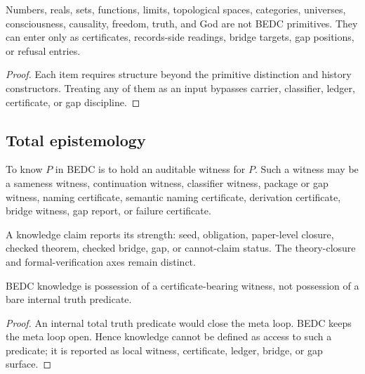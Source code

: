 \begin{corollary}
\label{cor:philosophy-mature-objects-not-inputs}
Numbers, reals, sets, functions, limits, topological spaces,
categories, universes, consciousness, causality, freedom, truth, and
God are not BEDC primitives. They can enter only as certificates,
records-side readings, bridge targets, gap positions, or refusal
entries.
\end{corollary}
\begin{proof}
Each item requires structure beyond the primitive distinction and
history constructors. Treating any of them as an input bypasses
carrier, classifier, ledger, certificate, or gap discipline.
\end{proof}

\subsection{Total epistemology}
\label{subsec:philosophy-total-epistemology}

\begin{definition}
\label{def:philosophy-bedc-knowledge-total}
To know \(P\) in BEDC is to hold an auditable witness for \(P\). Such a
witness may be a sameness witness, continuation witness, classifier
witness, package or gap witness, naming certificate, semantic naming
certificate, derivation certificate, bridge witness, gap report, or
failure certificate.
\end{definition}

\begin{definition}
\label{def:philosophy-knowledge-strength-total}
A knowledge claim reports its strength: seed, obligation, paper-level
closure, checked theorem, checked bridge, gap, or cannot-claim status.
The theory-closure and formal-verification axes remain distinct.
\end{definition}

\begin{theorem}
\label{thm:philosophy-knowledge-not-bare-truth-total}
BEDC knowledge is possession of a certificate-bearing witness, not
possession of a bare internal truth predicate.
\end{theorem}
\begin{proof}
An internal total truth predicate would close the meta loop. BEDC
keeps the meta loop open. Hence knowledge cannot be defined as access
to such a predicate; it is reported as local witness, certificate,
ledger, bridge, or gap surface.
\end{proof}

